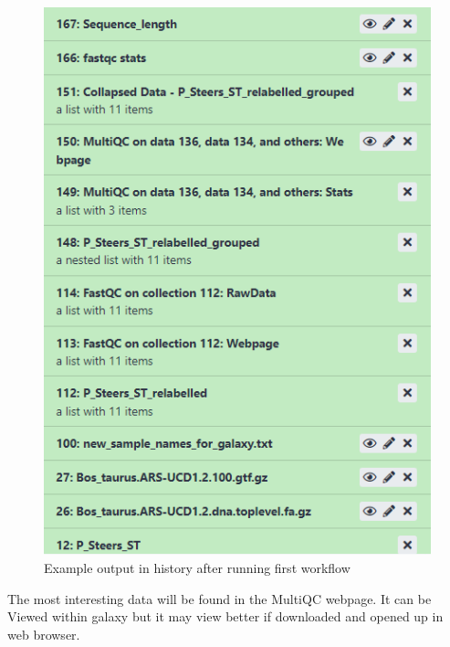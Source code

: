 \documentclass[
]{book}
\begin{document}
\begin{figure}

{\centering \includegraphics[width=6.18in]{images/image_history_after_step1} 

}

\caption{Example output in history after running first workflow}\label{fig:history-post-step1}
\end{figure}

The most interesting data will be found in the MultiQC webpage. It can be Viewed within galaxy but it may view better if downloaded and opened up in web browser.
\end{document}
